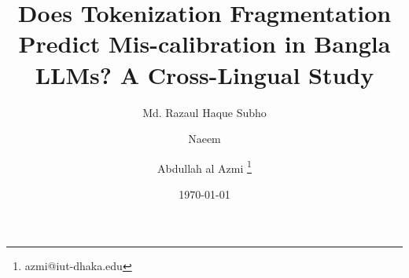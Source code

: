 \title{Does Tokenization Fragmentation Predict Mis-calibration in Bangla LLMs? A Cross-Lingual Study}

\author[1]{Md. Razaul Haque Subho}
\author[2]{Naeem}
\author[3]{Abdullah al Azmi \thanks{azmi@iut-dhaka.edu}}

\affil[1]{}
\affil[2]{}

\date{\today}

\maketitle

%
